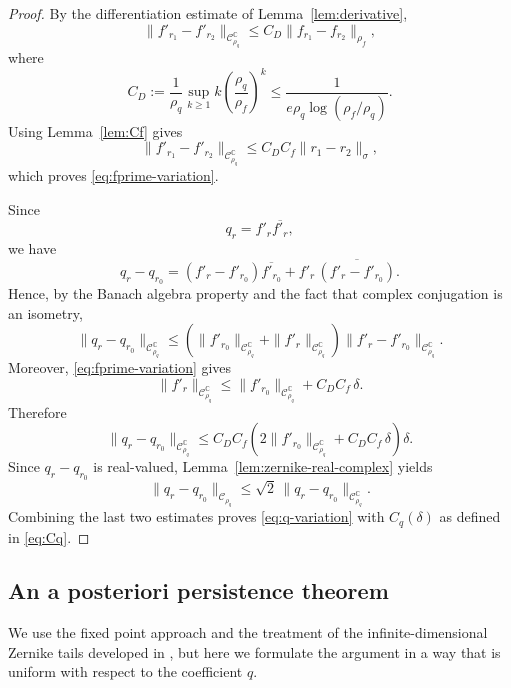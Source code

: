 \documentclass[11pt,a4paper]{amsart}
\begin{document}
\begin{proof}
	By the differentiation estimate of Lemma~\ref{lem:derivative},
	\[
	\|f'_{r_1}-f'_{r_2}\|_{\mathcal C_{\rho_q}^{\mathbb C}}
	\le
	C_D\|f_{r_1}-f_{r_2}\|_{\rho_f},
	\]
	where
	\[
	C_D
	:=
	\frac{1}{\rho_q}
	\sup_{k\ge1}
	k\left(\frac{\rho_q}{\rho_f}\right)^k
	\le
	\frac{1}{e\rho_q\log(\rho_f/\rho_q)}.
	\]
	Using Lemma~\ref{lem:Cf} gives
	\[
	\|f'_{r_1}-f'_{r_2}\|_{\mathcal C_{\rho_q}^{\mathbb C}}
	\le
	C_D C_f\|r_1-r_2\|_\sigma,
	\]
	which proves \eqref{eq:fprime-variation}.
	
	Since
	\[
	q_r=f'_r\overline{f'_r},
	\]
	we have
	\[
	q_r-q_{r_0}
	=
	(f'_r-f'_{r_0})\overline{f'_{r_0}}
	+
	f'_r\,
	\overline{(f'_r-f'_{r_0})}.
	\]
	Hence, by the Banach algebra property and the fact that complex
	conjugation is an isometry,
	\[
	\|q_r-q_{r_0}\|_{\mathcal C_{\rho_q}^{\mathbb C}}
	\le
	\left(
	\|f'_{r_0}\|_{\mathcal C_{\rho_q}^{\mathbb C}}
	+
	\|f'_r\|_{\mathcal C_{\rho_q}^{\mathbb C}}
	\right)
	\|f'_r-f'_{r_0}\|_{\mathcal C_{\rho_q}^{\mathbb C}}.
	\]
	Moreover, \eqref{eq:fprime-variation} gives
	\[
	\|f'_r\|_{\mathcal C_{\rho_q}^{\mathbb C}}
	\le
	\|f'_{r_0}\|_{\mathcal C_{\rho_q}^{\mathbb C}}
	+
	C_D C_f\,\delta.
	\]
	Therefore
	\[
	\|q_r-q_{r_0}\|_{\mathcal C_{\rho_q}^{\mathbb C}}
	\le
	C_D C_f
	\left(
	2\|f'_{r_0}\|_{\mathcal C_{\rho_q}^{\mathbb C}}
	+
	C_D C_f\,\delta
	\right)\delta.
	\]
	Since $q_r-q_{r_0}$ is real-valued,
	Lemma~\ref{lem:zernike-real-complex} yields
	\[
	\|q_r-q_{r_0}\|_{\mathcal C_{\rho_q}}
	\le
	\sqrt2\,
	\|q_r-q_{r_0}\|_{\mathcal C_{\rho_q}^{\mathbb C}}.
	\]
	Combining the last two estimates proves \eqref{eq:q-variation} with
	$C_q(\delta)$ as defined in \eqref{eq:Cq}.
\end{proof}

\subsection{An a posteriori persistence theorem}

We use the fixed point approach and the treatment of the
infinite-dimensional Zernike tails developed in \cite{ArioliKoch1},
but here we formulate the argument in a way that is uniform with respect to
the coefficient $q$.
\end{document}
